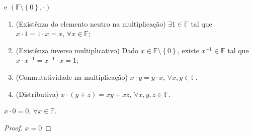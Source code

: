 \begin{definition}[Corpo]
	e $\left(\mathbb{F}\setminus\left\{0\right\},\cdot\right)$

	\begin{enumerate}[label={M\arabic*.},leftmargin=0em,itemindent=*]
		\item\label{multiplicação:1}

		      (Existênza do elemento neutro na multiplicação)
		      $\exists 1\in\mathbb{F}$ tal que $x\cdot 1=1\cdot x=x$, $\forall x\in\mathbb{F}$;

		\item\label{multiplicação:2}

		      (Existênza inverso multiplicativo)
		      Dado $x\in\mathbb{F}\setminus\left\{0\right\}$,
		      existe $x^{-1}\in\mathbb{F}$ tal que
		      $x\cdot x^{-1}=x^{-1}\cdot x=1$;

		\item\label{multiplicação:3}

		      (Conmutatividade na multiplicação)
		      $x\cdot y=y\cdot x$, $\forall x,y\in\mathbb{F}$.

		\item\label{multiplicação:4}

		      (Distributiva)
		      $x\cdot\left(y+z\right)=xy+xz$,
		      $\forall x,y,z\in\mathbb{F}$.
	\end{enumerate}
\end{definition}

\begin{proposition}
	$x\cdot0=0$, $\forall x\in\mathbb{F}$.
\end{proposition}

\begin{proof}
	$x=0$
\end{proof}

